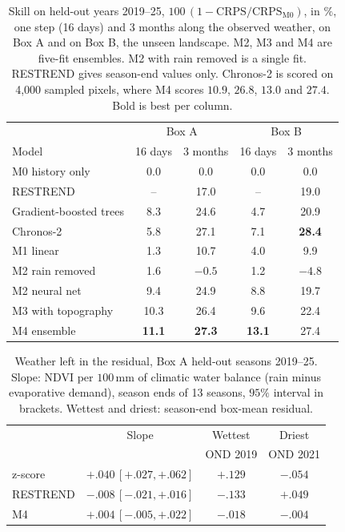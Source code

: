 \documentclass[letterpaper]{article} %
\begin{document}
\begin{table}[t]\centering\small\setlength{\tabcolsep}{3pt}
\begin{tabular}{lcccc}\toprule
 & \multicolumn{2}{c}{Box A} & \multicolumn{2}{c}{Box B}\\
Model & 16 days & 3 months & 16 days & 3 months\\\midrule
M0 history only & 0.0 & 0.0 & 0.0 & 0.0\\
RESTREND & -- & 17.0 & -- & 19.0\\
Gradient-boosted trees & 8.3 & 24.6 & 4.7 & 20.9\\
Chronos-2 & 5.8 & 27.1 & 7.1 & \textbf{28.4}\\
M1 linear & 1.3 & 10.7 & 4.0 & 9.9\\
M2 rain removed & 1.6 & $-0.5$ & 1.2 & $-4.8$\\
M2 neural net & 9.4 & 24.9 & 8.8 & 19.7\\
M3 with topography & 10.3 & 26.4 & 9.6 & 22.4\\
M4 ensemble & \textbf{11.1} & \textbf{27.3} & \textbf{13.1} & 27.4\\
\bottomrule\end{tabular}
\caption{Skill on held-out years 2019--25, $100\,(1-\mathrm{CRPS}/\mathrm{CRPS}_{\mathrm{M0}})$, in $\%$, one step (16 days) and 3 months along the observed weather, on Box A and on Box B, the unseen landscape. M2, M3 and M4 are five-fit ensembles. M2 with rain removed is a single fit. RESTREND gives season-end values only. Chronos-2 is scored on 4,000 sampled pixels, where M4 scores $10.9$, $26.8$, $13.0$ and $27.4$. Bold is best per column.}\label{tab:onestep}
\end{table}

\begin{table}[t]\centering\small\setlength{\tabcolsep}{4pt}

\begin{tabular}{lccc}\toprule
 & Slope & Wettest & Driest\\
 & & OND 2019 & OND 2021\\\midrule
z-score & $+.040$\,{\small$[+.027,+.062]$} & $+.129$ & $-.054$\\
RESTREND & $-.008$\,{\small$[-.021,+.016]$} & $-.133$ & $+.049$\\
M4 & $+.004$\,{\small$[-.005,+.022]$} & $-.018$ & $-.004$\\\bottomrule
\end{tabular}
\caption{Weather left in the residual, Box A held-out seasons 2019--25. Slope: NDVI per $100$\,mm of climatic water balance (rain minus evaporative demand), season ends of 13 seasons, $95\%$ interval in brackets. Wettest and driest: season-end box-mean residual.}\label{tab:bias}
\end{table}
\end{document}
